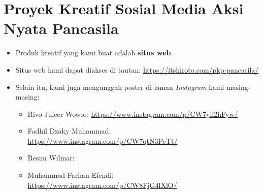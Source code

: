 \documentclass[12pt]{article}
\begin{document}
\section{Proyek Kreatif Sosial Media Aksi Nyata Pancasila}
\begin{itemize}
    \item Produk kreatif yang kami buat adalah \textbf{situs web}.
    \item Situs web kami dapat diakses di tautan: \url{https://itshiroto.com/pkp-pancasila/}
    \item Selain itu, kami juga mengunggah poster di laman \emph{Instagram} kami 
          masing-masing:
        \begin{itemize}
          \item Rivo Juicer Wowor: \url{https://www.instagram.com/p/CW7yll2hFyw/}
          \item Fadhil Dzaky Muhammad: \url{https://www.instagram.com/p/CW7qtN3PeTt/}
          \item Resnu Wilmar: 
          \item Muhammad Farhan Efendi: \url{https://www.instagram.com/p/CW8FjG4lXlO/}
        \end{itemize}
\end{itemize}
\end{document}
